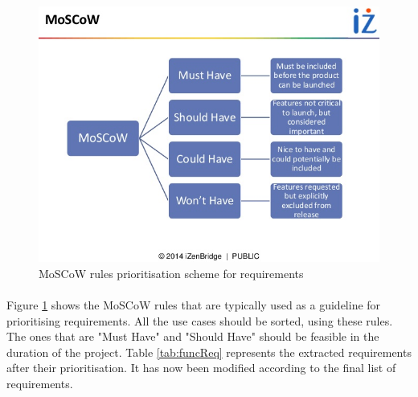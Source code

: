 \documentclass{l4proj}
\begin{document}
\begin{figure}[H]
	\centering
	\includegraphics[width=.5\textwidth]{images/MoSCoW}
	\caption{MoSCoW rules prioritisation scheme for requirements}
	\label{MoSCoW}
\end{figure} 
\paragraph{}
Figure \ref{MoSCoW} shows the MoSCoW rules that are typically used as a guideline for prioritising requirements. All the use cases should be sorted, using these rules. The ones that are "Must Have" and "Should Have" should be feasible in the duration of the project. Table \ref{tab:funcReq} represents the extracted requirements after their prioritisation. It has now been modified according to the final list of requirements.
\end{document}
